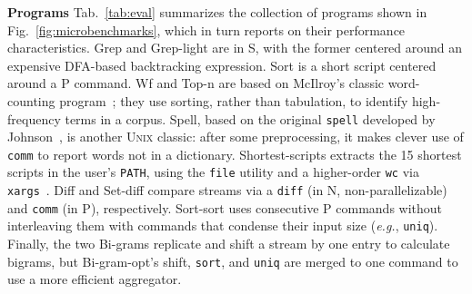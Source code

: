\documentclass[sigplan, review, screen, anonymous]{acmart}
\newcommand{\eg}{{\em e.g.}, }
\newcommand{\heading}[1]{\vspace{4pt}\noindent\textbf{#1}\enspace}
\newcommand{\ttt}[1]{\texttt{#1}}
\newcommand{\cn}[1]{\mbox{\textcircled{\footnotesize #1}}}
\newcommand{\sta}{\cn{\textsc{S}}\xspace}
\newcommand{\pur}{\cn{\textsc{P}}\xspace}
\newcommand{\npu}{\cn{\textsc{N}}\xspace}
\newcommand{\kk}[1]{[{\color{magenta}kk: #1}]}
\newcommand{\tr}[1]{} %
\newcommand{\sys}{{\scshape PaSh}\xspace}
\newcommand{\unix}{{\scshape Unix}\xspace}
\begin{document}
\heading{Programs}
Tab.~\ref{tab:eval} summarizes the collection of programs shown in Fig.~\ref{fig:microbenchmarks}, which in turn reports on their performance characteristics.
Grep and Grep-light are in \sta, with the former centered around an expensive DFA-based backtracking expression.
Sort is a short script centered around a \pur command.
Wf and Top-n are based on McIlroy's classic word-counting program~\cite{bentley1986literate};
  they use sorting, rather than tabulation, to identify high-frequency terms in a corpus.
Spell, based on the original \ttt{spell} developed by Johnson~\cite{bentley1985spelling}, is another \unix classic:
  after some preprocessing, it makes clever use of \ttt{comm} to report words not in a dictionary.
Shortest-scripts extracts the 15 shortest scripts in the user's \ttt{PATH}, using the \ttt{file} utility and a higher-order \ttt{wc} via \ttt{xargs}~\cite[pg. 7]{taylor2004wicked}.
Diff and Set-diff compare streams via a \ttt{diff} (in \npu, non-parallelizable) and \ttt{comm} (in \pur), respectively.
Sort-sort uses consecutive \pur commands without interleaving them with commands that condense their input size (\eg \ttt{uniq}).
Finally, the two Bi-grams replicate and shift a stream by one entry to calculate bigrams, but Bi-gram-opt's shift, \ttt{sort}, and \ttt{uniq} are merged to one command to use a more efficient aggregator.
\end{document}

